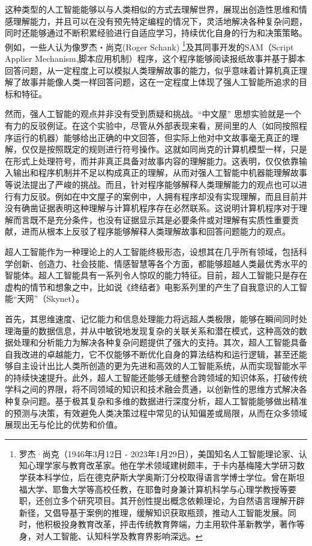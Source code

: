 这种类型的人工智能能够以与人类相似的方式去理解世界，展现出创造性思维和情感理解能力，并且可以在没有预先特定编程的情况下，灵活地解决各种复杂问题，同时还能够通过不断积累经验进行自适应学习，持续优化自身的行为和决策策略。例如，一些人认为像罗杰・尚克(Roger Schank) \footnote{罗杰·尚克（1946年3月12日 - 2023年1月29日），美国知名人工智能理论家、认知心理学家与教育改革家。他在学术领域建树颇丰，于卡内基梅隆大学研习数学获本科学位，后在德克萨斯大学奥斯汀分校取得语言学博士学位。曾在斯坦福大学、耶鲁大学等高校任教，在耶鲁时身兼计算机科学与心理学教授等要职，还创立多个研究项目。其开创性提出概念依赖理论，为自然语言理解开辟新径，又倡导基于案例的推理，缓解知识获取瓶颈，推动人工智能发展。同时，他积极投身教育改革，抨击传统教育弊端，力主用软件革新教学，著作等身，对人工智能、认知科学及教育界影响深远。}及其同事开发的SAM（Script Applier Mechanism,脚本应用机制）程序，这个程序能够阅读报纸故事并基于脚本回答问题，从一定程度上可以模拟人类理解故事的能力，似乎意味着计算机真正理解了故事并能像人类一样回答问题，这在一定程度上体现了强人工智能所追求的目标和特征。


然而，强人工智能的观点并非没有受到质疑和挑战。“中文屋” 思想实验就是一个有力的反驳例证。在这个实验中，尽管从外部表现来看，房间里的人（如同按照程序运行的机器）能够给出正确的中文回答，但实际上他对中文故事毫无真正的理解，仅仅是按照既定的规则进行符号操作。这就如同尚克的计算机模型一样，只是在形式上处理符号，而并非真正具备对故事内容的理解能力。这表明，仅仅依靠输入输出和程序机制并不足以构成真正的理解，从而对强人工智能中机器能理解故事等说法提出了严峻的挑战。而且，针对程序能够解释人类理解能力的观点也可以进行有力反驳。例如在中文屋子的案例中，人拥有程序却没有实现理解，而且目前并没有确凿证据表明这种理解与计算机程序存在必然联系。这说明计算机程序对于理解而言既不是充分条件，也没有证据显示其是必要条件或对理解有实质性重要贡献，进而从根本上反驳了程序能够解释人类理解故事和回答问题能力的观点。



超人工智能作为一种理论上的人工智能终极形态，设想其在几乎所有领域，包括科学创新、创造力、社会技能、情感智慧等各个方面，都能够超越人类最优秀水平的智能体。超人工智能具有一系列令人惊叹的能力特征。目前，超人工智能只是存在虚构的情节和想象之中，比如说《终结者》电影系列里的产生了自我意识的人工智能“天网”（Skynet）。


首先，其思维速度、记忆能力和信息处理能力将远超人类极限，能够在瞬间同时处理海量的数据信息，并从中敏锐地发现复杂的关联关系和潜在模式，这种高效的数据处理和分析能力为解决各种复杂问题提供了强大的支持。其次，超人工智能具备自我改进的卓越能力，它不仅能够不断优化自身的算法结构和运行逻辑，甚至还能够自主设计出比人类所创造的更为先进和高效的人工智能系统，从而实现智能水平的持续快速提升。此外，超人工智能还能够无缝整合跨领域的知识体系，打破传统学科之间的界限，将不同领域的知识和技术融会贯通，以创新性的思维方式解决各种复杂问题。基于极其复杂和多维的数据进行深度分析，超人工智能能够做出精准的预测与决策，有效避免人类决策过程中常见的认知偏差或局限，从而在众多领域展现出无与伦比的优势和价值。


